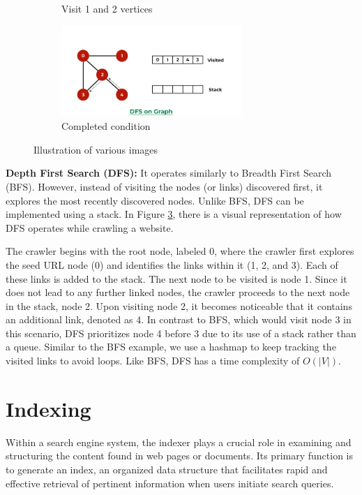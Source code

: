\begin{figure}[ht]
\begin{subfigure}[b]{0.5\textwidth}
    \caption{Visit 1 and 2 vertices} 
    \label{fig7:c} 
  \end{subfigure}%
  \begin{subfigure}[b]{0.5\textwidth}
    \centering
    \includegraphics[width=0.75\textwidth]{figures/dfs-4.png} 
    \caption{Completed condition} 
    \label{fig7:d} 
  \end{subfigure} 
  \caption{Illustration of various images}
  \label{fig:dfs} 
\end{figure}

\textbf{Depth First Search (DFS):} It operates similarly to Breadth First Search (BFS). However, instead of visiting the nodes (or links) discovered first, it explores the most recently discovered nodes. Unlike BFS, DFS can be implemented using a stack. In Figure \ref{fig:dfs}, there is a visual representation of how DFS operates while crawling a website.

The crawler begins with the root node, labeled 0, where the crawler first explores the seed URL node (0) and identifies the links within it (1, 2, and 3). Each of these links is added to the stack. The next node to be visited is node 1. Since it does not lead to any further linked nodes, the crawler proceeds to the next node in the stack, node 2. Upon visiting node 2, it becomes noticeable that it contains an additional link, denoted as 4. In contrast to BFS, which would visit node 3 in this scenario, DFS prioritizes node 4 before 3 due to its use of a stack rather than a queue. Similar to the BFS example, we use a hashmap to keep tracking the visited links to avoid loops. Like BFS, DFS has a time complexity of $O(|V|)$.

\section{Indexing}
\label{sec:indexing}
Within a search engine system, the indexer plays a crucial role in examining and structuring the content found in web pages or documents. Its primary function is to generate an index, an organized data structure that facilitates rapid and effective retrieval of pertinent information when users initiate search queries.


